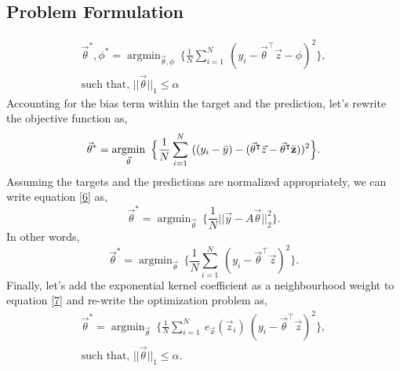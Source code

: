 \documentclass{article}
\DeclareMathOperator*{\argmin}{argmin}
\begin{document}
\subsection{Problem Formulation}
\begin{equation}\label{5}
    \begin{aligned}
        \vec{\theta}^{*}, \phi^{*} = \argmin_{\vec{\theta}, \phi}\ \Big\{\frac{1}{N} \sum_{i=1}^N\ (y_i - \vec{\theta}^\intercal \vec{z} - \phi)^2\Big\},\\
        \text{such that, } ||\vec{\theta}||_{1} \leq \alpha
    \end{aligned}
\end{equation}
Accounting for the bias term within the target and the prediction, let's rewrite the objective function as,
\begin{equation}\label{6}
    \vec{\theta}^{*} = \argmin_{\vec{\theta}}\ \Big\{\frac{1}{N} \sum_{i=1}^N\ ((y_i - \Bar{y}) - (\vec{\theta}^\intercal \vec{z} - \vec{\theta}^\intercal \Bar{\textbf{z}}))^2\Big\}.
\end{equation}
Assuming the targets and the predictions are normalized appropriately, we can write equation \eqref{6} as,
\begin{equation*}
    \vec{\theta}^{*} = \argmin_{\vec{\theta}}\ \Big\{\frac{1}{N} ||\vec{y} - A\vec{\theta}||_2^2\Big\}.
\end{equation*}
In other words,
\begin{equation}\label{7}
    \vec{\theta}^{*} = \argmin_{\vec{\theta}}\ \Big\{\frac{1}{N} \sum_{i=1}^N\ (y_i - \vec{\theta}^\intercal \vec{z})^2\Big\}.
\end{equation}
Finally, let's add the exponential kernel coefficient as a neighbourhood weight to equation \eqref{7} and re-write the optimization problem as,
\begin{equation}\label{8}
    \begin{aligned}
        \vec{\theta}^{*} = \argmin_{\vec{\theta}}\ \Big\{\frac{1}{N} \sum_{i=1}^N\ e_{\vec{x}}(\vec{z}_i)\ (y_i - \vec{\theta}^\intercal \vec{z})^2\Big\},\\
        \text{such that, } ||\vec{\theta}||_{1} \leq \alpha.
    \end{aligned}
\end{equation}
\end{document}
